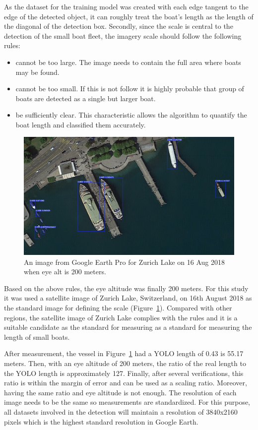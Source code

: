 As the dataset for the training model was created with each edge tangent to the edge of the detected object, it can roughly treat the boat's length as the length of the diagonal of the detection box. Secondly, since the scale is central to the detection of the small boat fleet, the imagery scale should follow the following rules:
\begin{itemize}
    \item cannot be too large. The image needs to contain the full area where boats may be found.
    \item cannot be too small. If this is not follow it is highly probable that group of boats are detected as a single but larger boat.
    \item be sufficiently clear. This characteristic allows the algorithm to quantify the boat length and classified them accurately.
\end{itemize}


\begin{figure}[t]
    \centering
    \includegraphics[width=\columnwidth]{img/zurich.jpeg}
    \caption{An image from Google Earth Pro for Zurich Lake on 16 Aug 2018 when eye alt is 200 meters.}
    \label{fig:zurich}
\end{figure}

Based on the above rules, the eye altitude was finally 200 meters. For this study it was used a satellite image of Zurich Lake, Switzerland, on 16th August 2018 as the standard image for defining the scale (Figure~\ref{fig:zurich}). Compared with other regions, the satellite image of Zurich Lake complies with the rules and it is a suitable candidate as the standard for measuring as a standard for measuring the length of small boats.

After measurement, the vessel in Figure~\ref{fig:zurich} had a YOLO length of 0.43 is 55.17 meters. Then, with an eye altitude of 200 meters, the ratio of the real length to the YOLO length is approximately 127. Finally, after several verifications, this ratio is within the margin of error and can be used as a scaling ratio. Moreover, having the same ratio and eye altitude is not enough. The resolution of each image needs to be the same so measurements are standardized. For this purpose, all datasets involved in the detection will maintain a resolution of 3840x2160 pixels which is the highest standard resolution in Google Earth.

